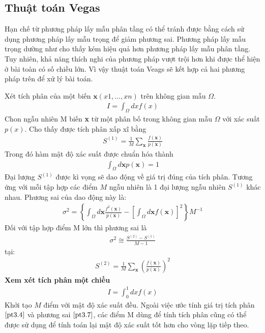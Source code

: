 \subsection{Thuật toán Vegas}\label{subsec:3.2.3}
Hạn chế từ phương pháp lấy mẫu phân tầng có thể tránh được bằng cách sử dụng phương pháp lấy mẫu trọng để giảm phương sai. 
Phương pháp lấy mẫu trọng dường như cho thấy kém hiệu quả hơn phương pháp lấy mẫu phân tầng. 
Tuy nhiên, khả năng thích nghi của phương pháp vượt trội hơn khi được thể hiện ở bài toàn có số chiều lớn. 
Vì vậy thuật toán Veags sẽ kết hợp cả hai phương pháp trên để xử lý bài toán.\par
Xét tích phân của một biến $\textbf{x}(x1,...,xn)$ trên không gian mẫu $\Omega$.
\begin{align}
      I=\int_\Omega{dxf(x)}
  \end{align}
  Chon ngẫu nhiên M biến \textbf{x} từ một phân bố trong không gian mẫu $\Omega$ với xác suất $p(x)$. Cho thấy được tích phân xấp xĩ bằng
  \begin{align}
      S^{(1)}={\frac{1}{M}}{\sum_\textbf{x}{\frac{f(\textbf{x})}{p(\textbf{x})}}}\label{pt3.4}
  \end{align}
Trong đó hàm mật độ xác suất được chuẩn hóa thành
\begin{align}
      \int_{\Omega}{d\textbf{x}p(\textbf{x})}=1
\end{align}
Đại lượng $S^{(1)}$ được kì vọng sẽ dao động về giá trị đúng của tích phân. Tương ứng với mỗi tập hợp các điểm $M$ ngẫu nhiên là 1 đại lượng ngẫu nhiên $S^{(1)}$ khác nhau. 
Phương sai của dao động này là:
\begin{align}
      \sigma^2=\left\{\int_{\Omega}d\textbf{x}\frac{f^2(\textbf{x})}{p(\textbf{x})}-\left[\int_{\Omega}d\textbf{x}f(\textbf{x})\right]^2\right\}M^{-1}\label{pt3.7}
\end{align}
Đối với tập hợp điểm M lớn thì phương sai là
\begin{align}
      \sigma^2\cong\frac{S^{(2)}-S^{(1)}}{M-1}\label{pt3.7}
\end{align}
tại: 
\begin{align}
      S^{(2)}=\frac{1}{M}{\sum_\textbf{x}}\left(\frac{f(\textbf{x})}{p(\textbf{x})}\right)^2
\end{align}
\textbf{Xem xét tích phân một chiều }\\
\begin{align}
      I=\int_0^1{dxf(x)}
\end{align}
Khởi tạo $M$ điểm với mật độ xác suất đều. Ngoài việc ước tính giá trị tích phân $ \ref{pt3.4} $ và phương sai $ \ref{pt3.7} $, các điểm M dùng để tính tích phân cũng có thể được sử dụng để tính toán lại mật độ xác suất tốt hơn cho vòng lặp tiếp theo. 
